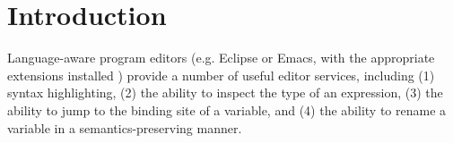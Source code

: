 \documentclass[letterpaper,USenglish]{lipics-v2016}
\newcommand{\Hazel}[0]{\textsf{Hazel}}
\newcommand{\HazelEnv}[0]{\Hazel}
\begin{document}
\begin{abstract}


\end{abstract}


\section{Introduction}



Language-aware program editors (e.g. Eclipse
or Emacs, with the appropriate  
extensions installed \cite{gamma2004contributing}) provide a number of useful editor services, including (1)
syntax highlighting, (2)
the ability to inspect the type of an expression, (3)
the ability to jump to the binding site of a variable, and (4)
the ability to rename a variable in a semantics-preserving manner. 
\end{document}
